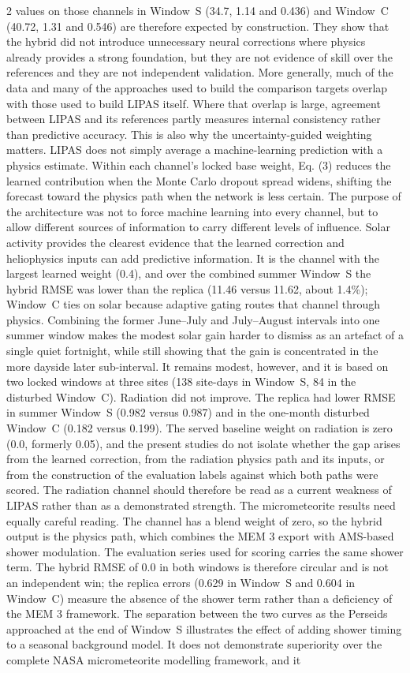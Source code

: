 \begin{multicols}{2}
values on those channels in Window~S (34.7, 1.14 and 0.436) and Window~C (40.72, 1.31 and 0.546) are therefore expected by construction. They show that the hybrid did not introduce unnecessary neural corrections where physics already provides a strong foundation, but they are not evidence of skill over the references and they are not independent validation. More generally, much of the data and many of the approaches used to build the comparison targets overlap with those used to build LIPAS itself. Where that overlap is large, agreement between LIPAS and its references partly measures internal consistency rather than predictive accuracy. This is also why the uncertainty-guided weighting matters. LIPAS does not simply average a machine-learning prediction with a physics estimate. Within each channel's locked base weight, Eq. (3) reduces the learned contribution when the Monte Carlo dropout spread widens, shifting the forecast toward the physics path when the network is less certain. The purpose of the architecture was not to force machine learning into every channel, but to allow different sources of information to carry different levels of influence. Solar activity provides the clearest evidence that the learned correction and heliophysics inputs can add predictive information. It is the channel with the largest learned weight (0.4), and over the combined summer Window~S the hybrid RMSE was lower than the replica (11.46 versus 11.62, about 1.4\%); Window~C ties on solar because adaptive gating routes that channel through physics. Combining the former June--July and July--August intervals into one summer window makes the modest solar gain harder to dismiss as an artefact of a single quiet fortnight, while still showing that the gain is concentrated in the more dayside later sub-interval. It remains modest, however, and it is based on two locked windows at three sites (138 site-days in Window~S, 84 in the disturbed Window~C). Radiation did not improve. The replica had lower RMSE in summer Window~S (0.982 versus 0.987) and in the one-month disturbed Window~C (0.182 versus 0.199). The served baseline weight on radiation is zero (0.0, formerly 0.05), and the present studies do not isolate whether the gap arises from the learned correction, from the radiation physics path and its inputs, or from the construction of the evaluation labels against which both paths were scored. The radiation channel should therefore be read as a current weakness of LIPAS rather than as a demonstrated strength. The micrometeorite results need equally careful reading. The channel has a blend weight of zero, so the hybrid output is the physics path, which combines the MEM 3 export with AMS-based shower modulation. The evaluation series used for scoring carries the same shower term. The hybrid RMSE of 0.0 in both windows is therefore circular and is not an independent win; the replica errors (0.629 in Window~S and 0.604 in Window~C) measure the absence of the shower term rather than a deficiency of the MEM 3 framework. The separation between the two curves as the Perseids approached at the end of Window~S illustrates the effect of adding shower timing to a seasonal background model. It does not demonstrate superiority over the complete NASA micrometeorite modelling framework, and it 
\end{multicols}
